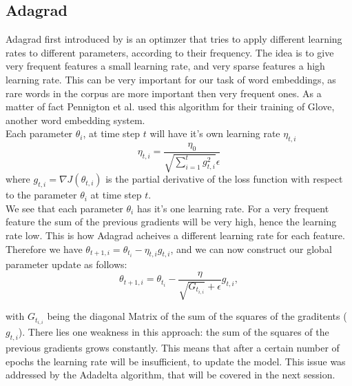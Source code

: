 {\subsection{Adagrad}\label{ssec:adagrad}
Adagrad first introduced by \cite{adagrad} is an optimzer that tries to apply different learning rates to different parameters, according to their frequency. The idea is to give very frequent features a small learning rate, and very sparse features a high learning rate. This can be very important for our task of word embeddings, as rare words in the corpus are more important then very frequent ones. As a matter of fact Pennigton et al. used this algorithm for their training of Glove, another word embedding system. \\
Each parameter $\theta_i$, at time step $t$ will have it's own learning rate $\eta_{t,i}$
 \begin{equation}
\eta_{t,i} = \frac{\eta_0}{\sqrt{\sum^{t}_{i=1} g^{2}_{t,i}} \epsilon}
\end{equation}
where
$g_{t,i} = \nabla J(\theta_{t,i})$  is the partial derivative of the loss function with respect to the parameter $\theta_i$ at time step $t$. \\ We see that each parameter $\theta_{i}$ has it's one learning rate. For a very frequent feature the sum of the previous gradients will be very high, hence the learning rate low. This is how Adagrad acheives a different learning rate for each feature. 
Therefore we have $ \theta_{t+1,i} = \theta_{t_i} - \eta_{t,i} g_{t,i} $, and we can now construct our global parameter update as follows: 
\begin{equation}
\theta_{t+1,i} = \theta_{t_i}- \frac{\eta}{\sqrt{G_{t_{i,i}}} + \epsilon} g_{t,i}, 
\end{equation} 

with  $G_{t_{i,i}}$ being the diagonal Matrix of the sum of the squares of the graditents ($g_{t,i} $). 
There lies one weakness in this approach: the sum of the squares of the previous gradients grows constantly. This means that after a certain number of epochs the learning rate will be insufficient, to update the model. This issue was addressed by the Adadelta algorithm, that will be covered in the next session. 

}
